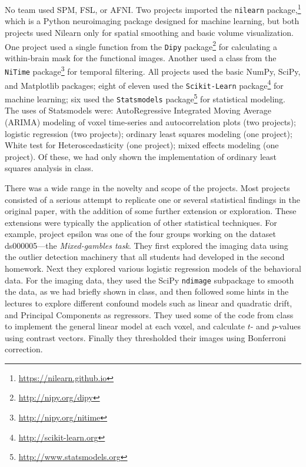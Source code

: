 No team used SPM, FSL, or AFNI.  Two projects imported the
\texttt{nilearn} package,\footnote{\url{https://nilearn.github.io}} which is a
Python neuroimaging package designed for machine learning, but both projects
used Nilearn only for spatial smoothing and basic volume visualization.  One
project used a single function from the
\texttt{Dipy} package\footnote{\url{http://nipy.org/dipy}} for calculating a
within-brain mask for the functional images.  Another used a class from the
\texttt{NiTime} package\footnote{\url{http://nipy.org/nitime}} for temporal
filtering.  All projects used the basic NumPy, SciPy, and Matplotlib packages;
eight of eleven used the \texttt{Scikit-Learn} package\footnote{\url{http://scikit-learn.org}}
for machine learning; six used the
\texttt{Statsmodels} package\footnote{\url{http://www.statsmodels.org}} for statistical
modeling.  The uses of Statsmodels
were: AutoRegressive Integrated Moving Average (ARIMA) modeling of voxel
time-series and autocorrelation plots (two projects); logistic regression (two
projects); ordinary least squares modeling (one project); White test for
Heteroscedasticity (one project); mixed effects modeling (one project).  Of
these, we had only shown the implementation of ordinary least squares analysis
in class.

There was a wide range in the novelty and scope of the projects.  Most
projects consisted of a serious attempt to replicate one or several
statistical findings in the original paper, with the addition of some further
extension or exploration.  These extensions were typically the application of
other statistical techniques.  For example, project epsilon was one of the
four groups working on the dataset ds000005---the \textit{Mixed-gambles
task}.  They first explored the imaging data using the outlier detection
machinery that all students had developed in the second homework.  Next they
explored various logistic regression models of the behavioral data.  For the
imaging data, they used the SciPy \texttt{ndimage} subpackage to smooth the
data, as we had briefly shown in class, and then followed some hints in the
lectures to explore different confound models such as linear and quadratic
drift, and Principal Components as regressors.  They used some of the code
from class to implement the general linear model at each voxel, and calculate
$t$- and $p$-values using contrast vectors.  Finally they thresholded their images
using Bonferroni correction.


